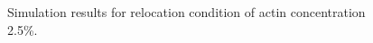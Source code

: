 \documentclass[a4paper,12pt]{book}
\begin{document}
\begin{figure}[h]
{ }%
 \caption{Simulation results for relocation condition of actin concentration 2.5\%.}
 \label{fig:res5}
\end{figure}
\end{document}
